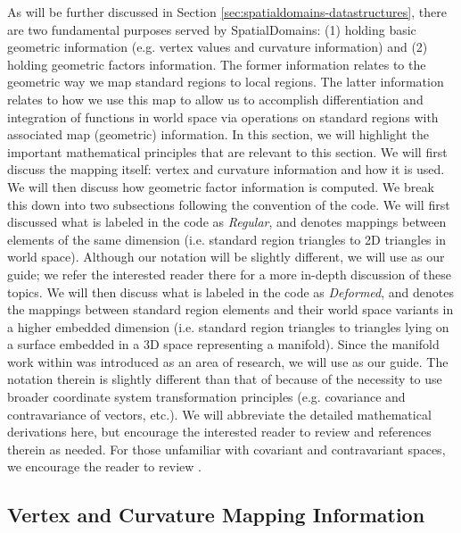 As will be further discussed in Section \ref{sec:spatialdomains-datastructures}, there are two fundamental purposes served by SpatialDomains:  (1) holding
basic geometric information (e.g. vertex values and curvature information) and (2) holding geometric factors information.  The former information relates to 
the geometric way we map standard regions to local regions.  The latter information relates to how we use this map to allow us to accomplish 
differentiation and integration of functions in world space via operations on standard regions with associated map (geometric) information.  In this section,
we will highlight the important mathematical principles that are relevant to this section. We will first discuss the mapping itself:  vertex and curvature information
and how it is used.  We will then discuss how geometric factor information is computed.  We break this down into two subsections following the convention of the
code.  We will first discussed what is labeled in the code as {\em Regular}, and denotes mappings between elements of the same dimension 
(i.e. standard region triangles to 2D triangles in world space).  Although our notation will be slightly different, we will use \cite{KaSh05} as our guide; we
refer the interested reader there for a more in-depth discussion of these topics. 
We will then discuss what is labeled in the code as {\em Deformed}, and denotes the mappings 
between standard region elements and their world space variants in a higher embedded dimension (i.e. standard region triangles to triangles lying on a 
surface embedded in a 3D space representing a manifold).  Since the manifold work within {\nek} was introduced as an area of research, we will
use \cite{CantwellYKPS14} as our guide.  The notation therein is slightly different than that of \cite{KaSh05} because of the necessity to use
broader coordinate system transformation principles (e.g. covariance and contravariance of vectors, etc.).   We will abbreviate the detailed
mathematical derivations here, but encourage the interested reader to review \cite{CantwellYKPS14} and references therein as needed.  For those
unfamiliar with covariant and contravariant spaces, we encourage the reader to review \cite{BorisenkoTS}.

\subsection{Vertex and Curvature Mapping Information}


